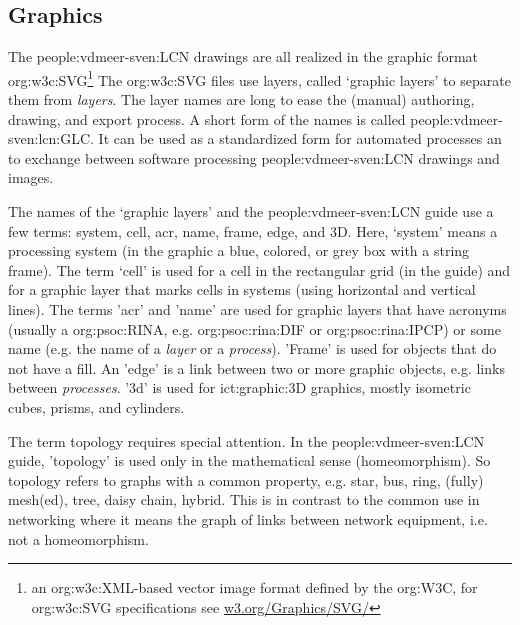 \subsection{Graphics}

    The \ac{people:vdmeer-sven:LCN} drawings are all realized in the graphic format \ac{org:w3c:SVG}\footnote{an \acs{org:w3c:XML}-based vector image format defined by the \acs{org:W3C}, for \acs{org:w3c:SVG} specifications see \href{https://www.w3.org/Graphics/SVG/}{w3.org/Graphics/SVG/}}
    The \ac{org:w3c:SVG} files use layers, called `graphic layers' to separate them from \textit{layers}.
    The layer names are long to ease the (manual) authoring, drawing, and export process.
    A short form of the names is called \ac{people:vdmeer-sven:lcn:GLC}.
    It can be used as a standardized form for automated processes an to exchange between software processing \ac{people:vdmeer-sven:LCN} drawings and images.

    The names of the `graphic layers' and the \ac{people:vdmeer-sven:LCN} guide use a few terms: system, cell, acr, name, frame, edge, and 3D.
    Here, `system' means a processing system (in the graphic a blue, colored, or grey box with a string frame).
    The term `cell' is used for a cell in the rectangular grid (in the guide) and for a graphic layer that marks cells in systems (using horizontal and vertical lines).
    The terms 'acr' and 'name' are used for graphic layers that have acronyms (usually a \acs{org:psoc:RINA}, e.g. \ac{org:psoc:rina:DIF} or \ac{org:psoc:rina:IPCP}) or some name (e.g. the name of a \textit{layer} or a \textit{process}).
    'Frame' is used for objects that do not have a fill.
    An 'edge' is a link between two or more graphic objects, e.g. links between \textit{processes}.
    '3d' is used for \ac{ict:graphic:3D} graphics, mostly isometric cubes, prisms, and cylinders.

    The term topology requires special attention.
    In the \ac{people:vdmeer-sven:LCN} guide, 'topology' is used only in the mathematical sense (homeomorphism).
    So topology refers to graphs with a common property, e.g. star, bus, ring, (fully) mesh(ed), tree, daisy chain, hybrid.
    This is in contrast to the common use in networking where it means the graph of links between network equipment, i.e. not a homeomorphism.



